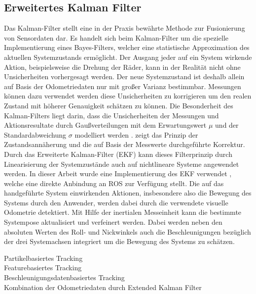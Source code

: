 \subsection{Erweitertes Kalman Filter}
Das Kalman-Filter stellt eine in der Praxis bewährte Methode zur Fusionierung von Sensordaten dar. Es handelt sich beim Kalman-Filter \cite{Kalman1960} um die spezielle Implementierung eines Bayes-Filters, welcher eine statistische Approximation des aktuellen Systemzustands ermöglicht. Der Ausgang jeder auf ein System wirkende Aktion, beispielsweise die Drehung der Räder, kann in der Realität nicht ohne Unsicherheiten vorhergesagt werden. Der neue Systemzustand ist deshalb allein auf Basis der Odometriedaten nur mit großer Varianz bestimmbar. Messungen können dazu verwendet werden diese Unsicherheiten zu korrigieren um den realen Zustand mit höherer Genauigkeit schätzen zu können. Die Besonderheit des Kalman-Filters liegt darin, dass die Unsicherheiten der Messungen und Aktionsresultate durch Gaußverteilungen mit dem Erwartungswert $\mu$ und der Standardabweichung $\sigma$ modelliert werden \cite{Hertzberg2012}.  zeigt das Prinzip der Zustandsannäherung und die auf Basis der Messwerte durchgeführte Korrektur.\\
Durch das Erweiterte Kalman-Filter (EKF) kann dieses Filterprinzip durch Linearisierung der Systemzustände auch auf nichtlineare Systeme angewendet werden. In dieser Arbeit wurde eine Implementierung des EKF verwendet \cite{EKF}, welche eine direkte Anbindung an ROS zur Verfügung stellt. Die auf das handgeführte System einwirkenden Aktionen, insbesondere also die Bewegung des Systems durch den Anwender, werden dabei durch die verwendete visuelle Odometrie detektiert. Mit Hilfe der inertialen Messeinheit kann die bestimmte Systempose aktualisiert und verfeinert werden. Dabei werden neben den absoluten Werten des Roll- und Nickwinkels auch die Beschleunigungen bezüglich der drei Systemachsen integriert um die Bewegung des Systems zu schätzen.


Partikelbasiertes Tracking\\
Featurebasiertes Tracking\\
Beschleunigungsdatenbasiertes Tracking\\
Kombination der Odometriedaten durch Extended Kalman Filter \\
